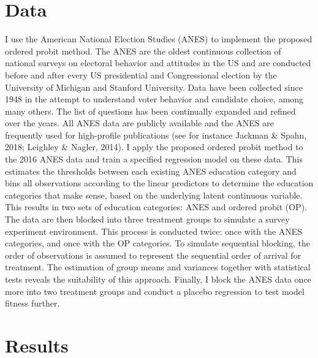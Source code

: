 \documentclass[12pt,econ]{sources/authesis}
\begin{document}
\hypertarget{ordblock-data}{%
\section{Data}\label{ordblock-data}}

I use the American National Election Studies (ANES) to implement the proposed ordered probit method. The ANES are the oldest continuous collection of national surveys on electoral behavior and attitudes in the US and are conducted before and after every US presidential and Congressional election by the University of Michigan and Stanford University. Data have been collected since 1948 in the attempt to understand voter behavior and candidate choice, among many others. The list of questions has been continually expanded and refined over the years. All ANES data are publicly available and the ANES are frequently used for high-profile publications (see for instance Jackman \& Spahn, 2018; Leighley \& Nagler, 2014). I apply the proposed ordered probit method to the 2016 ANES data and train a specified regression model on these data. This estimates the thresholds between each existing ANES education category and bins all observations according to the linear predictors to determine the education categories that make sense, based on the underlying latent continuous variable. This results in two sets of education categories: ANES and ordered probit (OP). The data are then blocked into three treatment groups to simulate a survey experiment environment. This process is conducted twice: once with the ANES categories, and once with the OP categories. To simulate sequential blocking, the order of observations is assumed to represent the sequential order of arrival for treatment. The estimation of group means and variances together with statistical tests reveals the suitability of this approach. Finally, I block the ANES data once more into two treatment groups and conduct a placebo regression to test model fitness further.

\hypertarget{ordblock-results}{%
\section{Results}\label{ordblock-results}}
\end{document}
